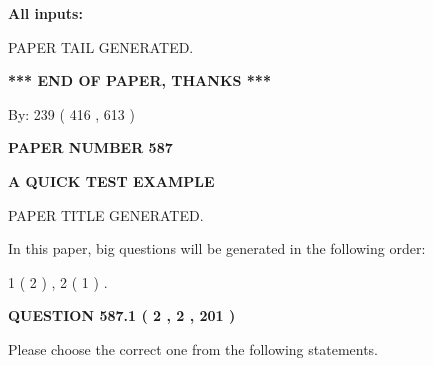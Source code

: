 \documentclass[12pt]{article}
\begin{document}
   
   
   
\noindent{}
   
   
   
   
\noindent\vspace{0.1in}\hspace{-0.08in} {\textbf{\Large{All inputs: }}}
   
   
   
   
   
   
 \vspace{0.2in}
 
   
   
\vspace{2.0in} PAPER TAIL GENERATED.
   
   
   
   
\vspace{1.0in} 
{\textbf{\large{ *** END OF PAPER, THANKS *** }}} 
   
   
\hspace{1.0in} By: 
 239 ( 416 ,  613 )
   
   
   
   
\newpage 
\setcounter{page}{ 
   587001 } 
   
   
   
   
 {\textbf{ \Large{ PAPER NUMBER  587  }}}
   
   
\vspace{0.2in}
   
   
   
   
   
   
   
   
 \vspace{0.2in}
{\LARGE {\textbf{ A QUICK TEST EXAMPLE}}}
   
   
 PAPER TITLE GENERATED.
   
   
   
\vspace{0.2in}
   
In this paper, big questions will be generated in the following order: 
   
   
   1 ( 2 )
 ,
   2 ( 1 )
 .
  
\vspace{0.2in}
  
{\textbf{\Large{QUESTION
587.1 
 ( 2 , 2 , 201 )
}}}
  
  
Please choose the correct one from the following statements.
 
\end{document}
